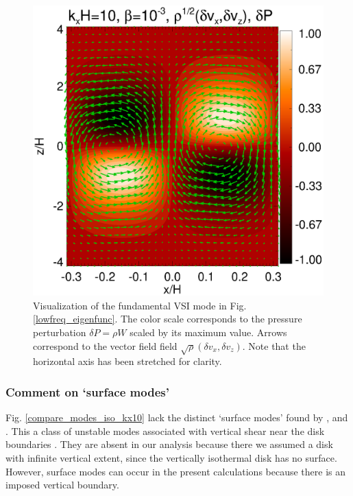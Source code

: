 \begin{figure}
  \includegraphics[width=\linewidth]{figures/result2d_iso}
  \caption{Visualization of the fundamental VSI mode in
    Fig. \ref{lowfreq_eigenfunc}. The color scale corresponds to the
    pressure perturbation $\delta P=\rho W$ scaled by its maximum value.
    Arrows correspond to the vector field field $\sqrt{\rho}(\delta
    v_x,\delta v_z)$. Note that the horizontal axis has been stretched 
    for clarity.  
    \label{lowfreq_eigenfunc_2d}
  }
\end{figure}

\subsubsection{Comment on `surface modes'}\label{surf_comment} 
Fig. \ref{compare_modes_iso_kx10} lack the distinct `surface modes' found by 
\cite{nelson13}, \cite{mcnally14}  and \cite{barker15}. 
This a class of unstable modes associated with vertical shear near the
disk boundaries \citep{barker15}. They are absent in our  
analysis because there we assumed a disk with infinite 
vertical extent, since the vertically isothermal disk has no
surface. However, surface modes can occur in the present calculations 
because there is an imposed vertical boundary.   

